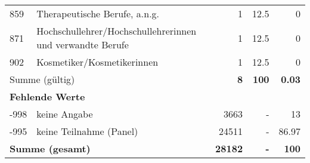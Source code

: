 \begin{longtable}{lXrrr}
     859 &
     \multicolumn{1}{X}{ Therapeutische Berufe, a.n.g.   } &


       \num{1} &
       \num[round-mode=places,round-precision=2]{12.5} &
         \num[round-mode=places,round-precision=2]{0} \\

     871 &
     \multicolumn{1}{X}{ Hochschullehrer/Hochschullehrerinnen und verwandte Berufe   } &


       \num{1} &
       \num[round-mode=places,round-precision=2]{12.5} &
         \num[round-mode=places,round-precision=2]{0} \\

     902 &
     \multicolumn{1}{X}{ Kosmetiker/Kosmetikerinnen   } &


       \num{1} &
       \num[round-mode=places,round-precision=2]{12.5} &
         \num[round-mode=places,round-precision=2]{0} \\
     \midrule
     \multicolumn{2}{l}{Summe (gültig)} &
       \textbf{\num{8}} &
     \textbf{100} &
       \textbf{\num[round-mode=places,round-precision=2]{0.03}} \\
     \multicolumn{5}{l}{\textbf{Fehlende Werte}}\\
       -998 &
       keine Angabe &
         \num{3663} &
        - &
         \num[round-mode=places,round-precision=2]{13} \\
       -995 &
       keine Teilnahme (Panel) &
         \num{24511} &
        - &
         \num[round-mode=places,round-precision=2]{86.97} \\
     \midrule
     \multicolumn{2}{l}{\textbf{Summe (gesamt)}} &
          \textbf{\num{28182}} &
        \textbf{-} &
        \textbf{100} \\
     \bottomrule
     \end{longtable}
     
